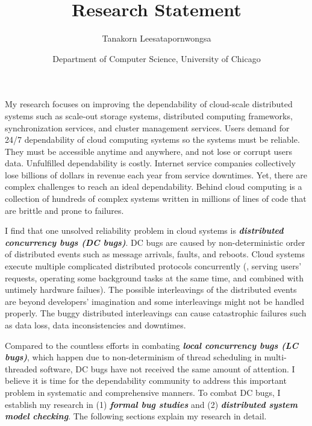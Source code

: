 \documentclass[11pt]{article}
\begin{document}
\title{Research Statement}
\author{Tanakorn Leesatapornwongsa}
\date{\vspace{-1ex} \small{Department of Computer Science, University of
Chicago}}

\maketitle

My research focuses on improving the dependability of cloud-scale distributed
systems such as scale-out storage systems, distributed computing frameworks,
synchronization services, and cluster management services. Users demand for
24/7 dependability of cloud computing systems so the systems must be reliable.
They must be accessible anytime and anywhere, and not lose or corrupt users
data. Unfulfilled dependability is costly. Internet service companies
collectively lose billions of dollars in revenue each year from service
downtimes. Yet, there are complex challenges to reach an ideal dependability.
Behind cloud computing is a collection of hundreds of complex systems written in
millions of lines of code that are brittle and prone to failures.

I find that one unsolved reliability problem in cloud systems is
\textbf{\textit{distributed concurrency bugs (DC bugs)}}. DC bugs are caused by
non-deterministic order of distributed events such as message arrivals, faults,
and reboots. Cloud systems execute multiple complicated distributed protocols
concurrently (\eg, serving users' requests, operating some background tasks at
the same time, and combined with untimely hardware failues). The possible
interleavings of the distributed events are beyond developers' imagination and
some interleavings might not be handled properly. The buggy
distributed interleavings can cause catastrophic failures such as data loss,
data inconsistencies and downtimes. 

Compared to the countless efforts in combating \textbf{\textit{local concurrency
bugs (LC bugs)}}, which happen due to non-determinism of thread scheduling in
multi-threaded software, DC bugs have not received the same amount of attention.
I believe it is time for the dependability community to address this important
problem in systematic and comprehensive manners.  To combat DC bugs, I establish
my research in (1) \textbf{\textit{formal bug studies}} and (2)
\textbf{\textit{distributed system model checking}}. The following sections
explain my research in detail.
\end{document}
